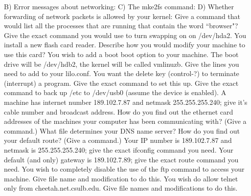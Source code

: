\vskip 0.3in
B) Error messages about networking:
\vskip 0.3in
C) The {\ltt{}mke2fs} command:
\vskip 0.3in
D) Whether forwarding of network packets is allowed by your kernel:
\vskip 0.3in
\ques
Give a command that would list all the processes that are running that
contain the word ``browser"?
\vskip 0.4in
Give the exact command you would use to turn swapping on on
{\ltt{}/dev/hda2}.
\vskip 0.4in
\ques
You install a new flash card reader.
Describe how you would modify your machine to use this card?
\vskip 1.5in
You wish to add a boot boot option to your machine.
The boot drive will be {\ltt{}/dev/hdb2}, the kernel will
be called {\ltt{}vmlinuzb}.
Give the lines you need to add to your {\ltt{}lilo.conf}.
\vskip 1.8in
\vfill\eject
\ques
You want the delete key ({\ltt{}control-?}) to terminate (interrupt)
a program. Give the exact command to set this up.
\vskip 0.4in
Give the exact command to back up {\ltt{}/etc} to {\ltt{}/dev/usb0}
(assume the device is enabled).
\vskip 0.4in
\ques
A machine has internet number {\ltt{}189.102.7.87} and
netmask {\ltt{}255.255.255.240}; give it's cable number and broadcast address.
\vskip 1.0in
How do you find out the ethernet card addresses of the machines your computer 
has been communicating with?  (Give a command.)
\vskip 0.4in
What file determines your DNS name server?
\vskip 0.4in
How do you find out your default route?
(Give a command.)
\vskip 0.4in
\ques
Your IP number is {\ltt{}189.102.7.87} and netmask is {\ltt{}255.255.255.240};
give the exact {\ltt{}ifconfig} command you need.
\vskip 0.4in
Your default (and only) gateway is {\ltt{}189.102.7.89};
give the exact {\ltt{}route} command you need.
\vskip 0.4in
You wish to completely disable the use of the {\ltt{}ftp} command to
access your machine.
Give file name and modification to do this.
\vskip 0.8in
You wish do allow {\ltt{}telnet} only from {\ltt{}cheetah.net.csulb.edu}.
Give file names and modifications to do this.
\vskip 1.4in
\bye
